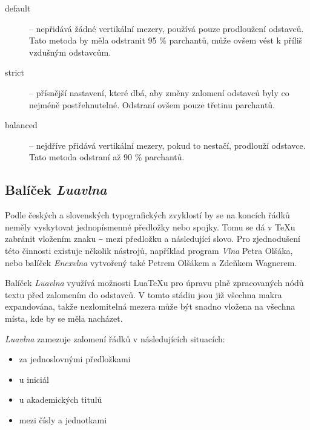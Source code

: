 \documentclass{csbulletin}
\newcommand\balicek[1]{\textit{#1}}
\begin{document}
 \begin{description}
   \item[default] – nepřidává žádné vertikální mezery, používá pouze prodloužení odstavců. Tato metoda by měla odstranit 95 \% parchantů, může ovšem vést k příliš vzdušným odstavcům.
   \item[strict] – přísnější nastavení, které dbá, aby změny zalomení odstavců byly co nejméně postřehnutelné.  Odstraní ovšem pouze třetinu parchantů.
   \item[balanced] – nejdříve přidává vertikální mezery, pokud to nestačí, prodlouží odstavce. Tato metoda odstraní až 90 \% parchantů.
  \end{description}




\subsection{Balíček \balicek{Luavlna}}

Podle českých a slovenských typografických zvyklostí by se na koncích řádků neměly vyskytovat jednopísmenné předložky nebo spojky. 
Tomu se dá v \TeX u zabránit vložením znaku \verb|~| mezi předložku a následující slovo. Pro zjednodušení této činnosti existuje
několik nástrojů, například program \balicek{Vlna} Petra Olšáka, nebo balíček \balicek{Encxvlna} vytvořený také Petrem Olšákem a Zdeňkem Wagnerem.

Balíček \balicek{Luavlna} \cite{luavlna} využívá možnosti Lua\TeX u pro úpravu plně zpracovaných nódů textu před zalomením do odstavců. 
V tomto stádiu jsou již všechna makra expandována, takže nezlomitelná mezera může být snadno vložena na všechna místa, kde by se měla nacházet.

\balicek{Luavlna} zamezuje zalomení řádků v následujících situacích:

\begin{itemize}
  \item za jednoslovnými předložkami
  \item u iniciál
  \item u akademických titulů
  \item mezi čísly a jednotkami
\end{itemize}
  
\end{document}

